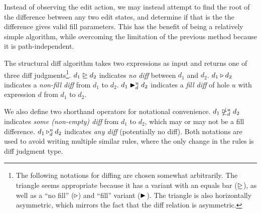 Instead of observing the edit action, we may instead attempt to find the root of the difference between any two edit states, and determine if that is the the difference gives valid fill parameters. This has the benefit of being a relatively simple algorithm, while overcoming the limitation of the previous method because it is path-independent.

The structural diff algorithm takes two expressions as input and returns one of three diff judgments\footnote{The following notations for diffing are chosen somewhat arbitrarily. The triangle seems appropriate because it has a variant with an equals bar ($\nodiff{}{}$), as well as a ``no fill'' ($\nfdiff{}{}{}{}$) and ``fill'' variant ($\fdiff{}{}{}{}$). The triangle is also horizontally asymmetric, which mirrors the fact that the diff relation is asymmetric.}. $\nodiff{d_1}{d_2}$ indicates \textit{no diff} between $d_1$ and $d_2$. $\nfdiff{d_1}{d_2}$ indicates a \textit{non-fill diff} from $d_1$ to $d_2$. $\fdiff{d_1}{d_2}{u}{d}$ indicates a \textit{fill diff} of hole $u$ with expression $d$ from $d_1$ to $d_2$.

We also define two shorthand operators for notational convenience. $\sdiff{d_1}{d_2}{u}{d}$ indicates \textit{some (non-empty) diff} from $d_1$ to $d_2$, which may or may not be a fill difference. $\adiff{d_1}{d_2}{u}{d}$ indicates \textit{any diff} (potentially no diff). Both notations are used to avoid writing multiple similar rules, where the only change in the rules is diff judgment type.


\begin{singlespace}

\end{singlespace}

